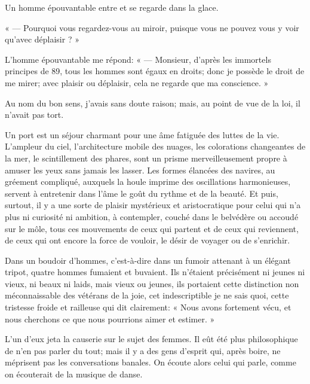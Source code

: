 Un homme épouvantable entre et se regarde dans la glace.

« --- Pourquoi vous regardez{}-vous au miroir, puisque vous ne pouvez vous
y voir qu’avec déplaisir ? »

L’homme épouvantable me répond: « --- Monsieur,
d’après les immortels principes de 89, tous les hommes
sont égaux en droits; donc je possède le droit de me mirer; avec
plaisir ou déplaisir, cela ne regarde que ma conscience. »

Au nom du bon sens, j’avais sans doute raison; mais, au
point de vue de la loi, il n’avait pas tort.


Un port est un séjour charmant pour une âme fatiguée des luttes de la
vie. L’ampleur du ciel,
l’architecture mobile des nuages, les colorations
changeantes de la mer, le scintillement des phares, sont un prisme
merveilleusement propre à amuser les yeux sans jamais les lasser. Les
formes élancées des navires, au gréement compliqué, auxquels la houle
imprime des oscillations harmonieuses, servent à entretenir dans
l’âme le goût du rythme et de la beauté. Et puis,
surtout, il y a une sorte de plaisir mystérieux et aristocratique pour
celui qui n’a plus ni curiosité ni ambition, à
contempler, couché dans le belvédère ou accoudé sur le môle, tous ces
mouvements de ceux qui partent et de ceux qui reviennent, de ceux qui
ont encore la force de vouloir, le désir de voyager ou de
s’enrichir.


Dans un boudoir d’hommes,
c’est{}-à{}-dire dans un fumoir attenant à un élégant
tripot, quatre hommes fumaient et buvaient. Ils
n’étaient précisément ni jeunes ni vieux, ni beaux ni
laids, mais vieux ou jeunes, ils portaient cette distinction non
méconnaissable des vétérans de la joie, cet indescriptible je ne sais
quoi, cette tristesse froide et railleuse qui dit clairement: « Nous
avons fortement vécu, et nous cherchons ce que nous pourrions aimer et
estimer. »

L’un d’eux jeta la causerie sur le
sujet des femmes. Il eût été plus philosophique de
n’en pas parler du tout; mais il y a des gens
d’esprit qui, après boire, ne méprisent pas les
conversations banales. On écoute alors celui qui parle, comme on
écouterait de la musique de danse.

